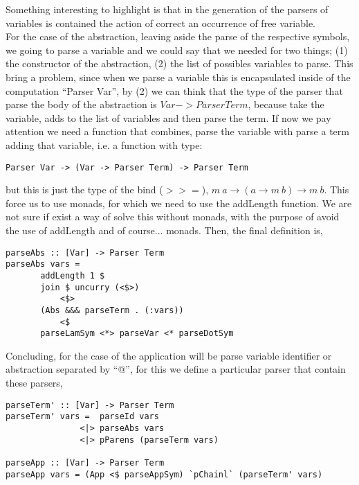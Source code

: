 \documentclass[a4paper,10pt]{article}
\begin{document}
Something interesting to highlight is that in the generation of the parsers of
variables is contained the action of correct an occurrence of free variable.\\

For the case of the abstraction, leaving aside the parse of the respective symbols,
we going to parse a variable and we could say that we needed for two things;
(1) the constructor of the abstraction, (2) the list of possibles variables to parse.
This bring a problem, since when we parse a variable this is encapsulated inside
of the computation ``Parser Var'', by (2) we can think that the type of the parser
that parse the body of the abstraction is $Var -> Parser Term$, because take the
variable, adds to the list of variables and then parse the term.
If now we pay attention we need a function that combines, parse the variable with
parse a term adding that variable, i.e. a function with type:

\begin{lstlisting}
Parser Var -> (Var -> Parser Term) -> Parser Term
\end{lstlisting}

but this is just the type of the bind ($>>=$), $m \ a \rightarrow (a \rightarrow m \ b) \rightarrow m \ b$. This force us to use monads, for which we need to use the addLength function. We are
not sure if exist a way of solve this without monads, with the purpose of avoid the
use of addLength and of course... monads. Then, the final definition is,

\begin{lstlisting}
parseAbs :: [Var] -> Parser Term
parseAbs vars = 
       addLength 1 $
       join $ uncurry (<$>) 
           <$> 
       (Abs &&& parseTerm . (:vars))
       	   <$ 
       parseLamSym <*> parseVar <* parseDotSym
\end{lstlisting}

Concluding, for the case of the application will be parse variable identifier or
abstraction separated by ``$@$'', for this we define a particular parser that
contain these parsers,

\begin{lstlisting}
parseTerm' :: [Var] -> Parser Term
parseTerm' vars =  parseId vars
               <|> parseAbs vars
               <|> pParens (parseTerm vars)

parseApp :: [Var] -> Parser Term
parseApp vars = (App <$ parseAppSym) `pChainl` (parseTerm' vars)
\end{lstlisting}
\end{document}
